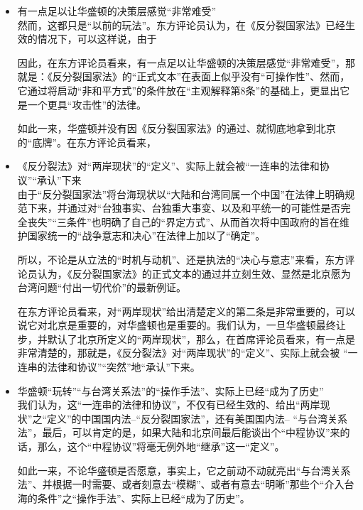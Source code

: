 \documentclass[a4paper,11pt]{article}
\begin{document}
\begin{itemize}
\begin{itemize}
\item 有一点足以让华盛顿的决策层感觉“非常难受”\\
\label{sec-3_2_4}%
然而，这都只是“以前的玩法”。东方评论员认为，在《反分裂国家法》已经生效的情况下，可以这样说，由于

    因此，在东方评论员看来，有一点足以让华盛顿的决策层感觉“非常难受”，那就是：《反分裂国家法》的“正式文本”在表面上似乎没有“可操作性”、然而，它通过将启动“非和平方式”的条件放在“主观解释第8条”的基础上，更显出它是一个更具“攻击性”的法律。

    如此一来，华盛顿并没有因《反分裂国家法》的通过、就彻底地拿到北京的“底牌”。在东方评论员看来，
 

\item 《反分裂法》对“两岸现状”的“定义”、实际上就会被“一连串的法律和协议”“承认”下来\\
\label{sec-3_2_5}%
由于“反分裂国家法”将台海现状以“大陆和台湾同属一个中国”在法律上明确规范下来，并通过对“台独事实、台独重大事变、以及和平统一的可能性是否完全丧失”“三条件”也明确了自己的“界定方式”、从而首次将中国政府的旨在维护国家统一的“战争意志和决心”在法律上加以了“确定”。

    所以，不论是从立法的“时机与动机”、还是执法的“决心与意志”来看，东方评论员认为，《反分裂国家法》的正式文本的通过并立刻生效、显然是北京愿为台湾问题“付出一切代价”的最新例证。

    在东方评论员看来，对“两岸现状”给出清楚定义的第二条是非常重要的，可以说它对北京是重要的，对华盛顿也是重要的。我们认为，一旦华盛顿最终让步，并默认了北京所定义的“两岸现状”，那么，在首席评论员看来，有一点是非常清楚的，那就是，《反分裂法》对“两岸现状”的“定义”、实际上就会被 “一连串的法律和协议”“突然”地“承认”下来。
 

\item 华盛顿“玩转”“与台湾关系法”的“操作手法”、实际上已经“成为了历史”\\
\label{sec-3_2_6}%
我们认为，这“一连串的法律和协议”，不仅有已经生效的、给出“两岸现状”之“定义”的中国国内法--“反分裂国家法”，还有美国国内法-- “与台湾关系法”，最后，可以肯定的是，如果大陆和北京间最后能谈出个“中程协议”来的话，那么，这个“中程协议”将毫无例外地“继承”这一“定义”。

    如此一来，不论华盛顿是否愿意，事实上，它之前动不动就亮出“与台湾关系法”、并根据一时需要、或者刻意去“模糊”、或者有意去“明晰”那些个“介入台海的条件”之“操作手法”、实际上已经“成为了历史”。
 


\end{itemize}
\end{itemize}
\end{document}
